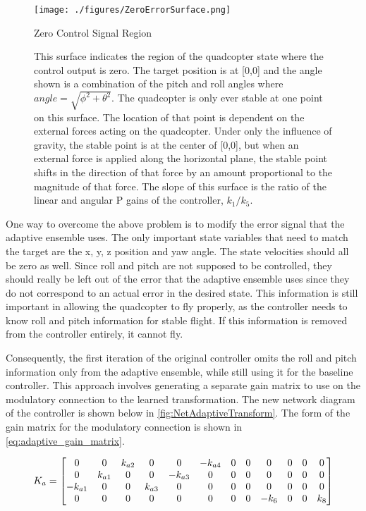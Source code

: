 \documentclass[letterpaper,12pt,titlepage,oneside,final]{book}
\begin{document}
\begin{figure}
\centering
\texttt{[image: ./figures/ZeroErrorSurface.png]} %
\caption{Zero Control Signal Region}
\label{fig:ZeroErrorSurface}
\captionsetup{singlelinecheck=off,font=footnotesize}
\caption*{
This surface indicates the region of the quadcopter state where the control output is zero.
The target position is at [0,0] and the angle shown is a combination of the pitch and roll angles where $angle = \sqrt{\phi^{2} + \theta^{2}}$.
The quadcopter is only ever stable at one point on this surface.
The location of that point is dependent on the external forces acting on the quadcopter.
Under only the influence of gravity, the stable point is at the center of [0,0], but when an external force is applied along the horizontal plane, the stable point shifts in the direction of that force by an amount proportional to the magnitude of that force.
The slope of this surface is the ratio of the linear and angular P gains of the controller, $k_{1}/k_{5}$.}
\end{figure}


One way to overcome the above problem is to modify the error signal that the adaptive ensemble uses. 
The only important state variables that need to match the target are the x, y, z position and yaw angle. 
The state velocities should all be zero as well. 
Since roll and pitch are not supposed to be controlled, they should really be left out of the error that the adaptive ensemble uses since they do not correspond to an actual error in the desired state. 
This information is still important in allowing the quadcopter to fly properly, as the controller needs to know roll and pitch information for stable flight. If this information is removed from the controller entirely, it cannot fly.

Consequently, the first iteration of the original controller omits the roll and pitch information only from the adaptive ensemble, while still using it for the baseline controller. 
This approach involves generating a separate gain matrix to use on the modulatory connection to the learned transformation. 
The new network diagram of the controller is shown below in \autoref{fig:NetAdaptiveTransform}. 
The form of the gain matrix for the modulatory connection is shown in \eqref{eq:adaptive_gain_matrix}.

\begin{equation} \label{eq:adaptive_gain_matrix}
K_{a} =
\setcounter{MaxMatrixCols}{12}
\begin{bmatrix}
0 & 0 & k_{a2} & 0 & 0 & -k_{a4} & 0 & 0 & 0 & 0 & 0 & 0 \\
0 & k_{a1} & 0 & 0 & -k_{a3} & 0 & 0 & 0 & 0 & 0 & 0 & 0 \\
-k_{a1} & 0 & 0 & k_{a3} & 0 & 0 & 0 & 0 & 0 & 0 & 0 & 0 \\
0 & 0 & 0 & 0 & 0 & 0 & 0 & 0 & -k_{6} & 0 & 0 & k_{8}
\end{bmatrix}
\end{equation}
\end{document}
